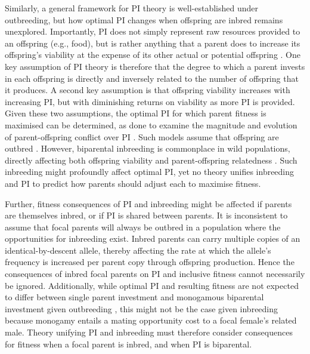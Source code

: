 \documentclass[10pt,letterpaper]{article}
\begin{document}
Similarly, a general framework for PI theory is well-established under outbreeding, but how optimal PI changes when offspring are inbred remains unexplored. Importantly, PI does not simply represent raw resources provided to an offspring (e.g., food), but is rather anything that a parent does to increase its offspring's viability at the expense of its other actual or potential offspring \cite[][]{Trivers1972, Trivers1974}. One key assumption of PI theory is therefore that the degree to which a parent invests in each offspring is directly and inversely related to the number of offspring that it produces. A second key assumption is that offspring viability increases with increasing PI, but with diminishing returns on viability as more PI is provided. Given these two assumptions, the optimal PI for which parent fitness is maximised can be determined, as done to examine the magnitude and evolution of parent-offspring conflict over PI \cite[e.g.,][]{Macnair1978, Parker1978, Parker1985, DeJong2005, Kuijper2012}. Such models assume that offspring are outbred \cite[or result from self-fertilisation,][]{DeJong2005}. However, biparental inbreeding is commonplace in wild populations, directly affecting both offspring viability and parent-offspring relatedness \cite[][]{OGrady2006, Charlesworth2009}. Such inbreeding might profoundly affect optimal PI, yet no theory unifies inbreeding and PI to predict how parents should adjust each to maximise fitness.

Further, fitness consequences of PI and inbreeding might be affected if parents are themselves inbred, or if PI is shared between parents. It is inconsistent to assume that focal parents will always be outbred in a population where the opportunities for inbreeding exist. Inbred parents can carry multiple copies of an identical-by-descent allele, thereby affecting the rate at which the allele's frequency is increased per parent copy through offspring production. Hence the consequences of inbred focal parents on PI and inclusive fitness cannot necessarily be ignored. Additionally, while optimal PI and resulting fitness are not expected to differ between single parent investment and monogamous biparental investment given outbreeding \cite[][]{Parker1985}, this might not be the case given inbreeding because monogamy entails a mating opportunity cost \cite[][]{Waser1986} to a focal female's related male. Theory unifying PI and inbreeding must therefore consider consequences for fitness when a focal parent is inbred, and when PI is biparental.
\end{document}
